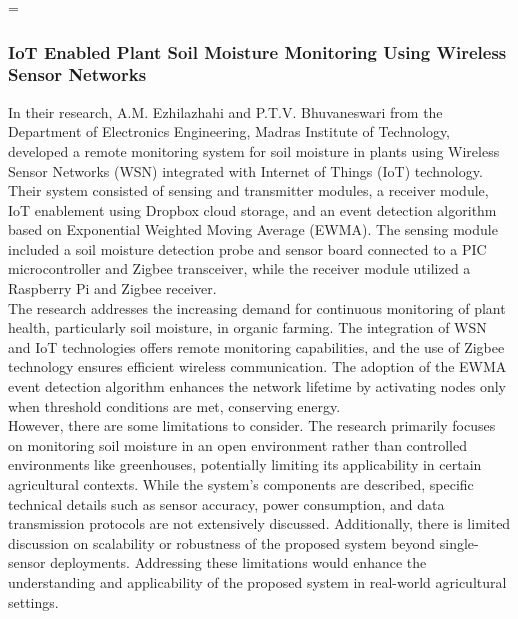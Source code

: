=\documentclass[12pt, a4paper]{article}
\begin{document}
\subsubsection{IoT Enabled Plant Soil Moisture Monitoring Using Wireless Sensor Networks}
In their research, A.M. Ezhilazhahi and P.T.V. Bhuvaneswari \cite{ezhilazhahi2017iot} from the Department of Electronics Engineering, Madras Institute of Technology, developed a remote monitoring system for soil moisture in plants using Wireless Sensor Networks (WSN) integrated with Internet of Things (IoT) technology.\\
Their system consisted of sensing and transmitter modules, a receiver module, IoT enablement using Dropbox cloud storage, and an event detection algorithm based on Exponential Weighted Moving Average (EWMA). The sensing module included a soil moisture detection probe and sensor board connected to a PIC microcontroller and Zigbee transceiver, while the receiver module utilized a Raspberry Pi and Zigbee receiver.\\
The research addresses the increasing demand for continuous monitoring of plant health, particularly soil moisture, in organic farming. The integration of WSN and IoT technologies offers remote monitoring capabilities, and the use of Zigbee technology ensures efficient wireless communication. The adoption of the EWMA event detection algorithm enhances the network lifetime by activating nodes only when threshold conditions are met, conserving energy.\\
However, there are some limitations to consider. The research primarily focuses on monitoring soil moisture in an open environment rather than controlled environments like greenhouses, potentially limiting its applicability in certain agricultural contexts. While the system's components are described, specific technical details such as sensor accuracy, power consumption, and data transmission protocols are not extensively discussed. Additionally, there is limited discussion on scalability or robustness of the proposed system beyond single-sensor deployments. Addressing these limitations would enhance the understanding and applicability of the proposed system in real-world agricultural settings.
\end{document}
